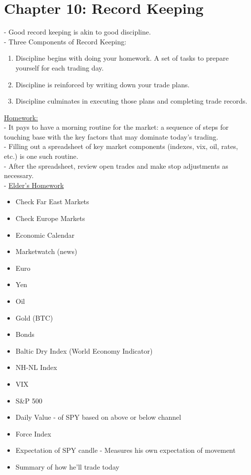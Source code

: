 \documentclass[12pt,fullpage]{article}
\begin{document}
\section*{Chapter 10: Record Keeping}
- Good record keeping is akin to good discipline.\\
- Three Components of Record Keeping:
\begin{enumerate}
   \itemsep0em
   \item Discipline begins with doing your homework. A set of tasks to prepare yourself for each trading day.
   \item Discipline is reinforced by writing down your trade plans.
   \item Discipline culminates in executing those plans and completing trade records.
\end{enumerate}
\underline{Homework:}\\
- It pays to have a morning routine for the market: a sequence of steps for touching base with the key factors that may dominate today's trading.\\
- Filling out a spreadsheet of key market components (indexes, vix, oil, rates, etc.) is one such routine.\\
- After the spreadsheet, review open trades and make stop adjustments as necessary.\\
- \underline{Elder's Homework}
\begin{itemize}
   \itemsep-0.5em
   \item Check Far East Markets
   \item Check Europe Markets
   \item Economic Calendar
   \item Marketwatch (news)
   \item Euro
   \item Yen
   \item Oil
   \item Gold (BTC)
   \item Bonds
   \item Baltic Dry Index (World Economy Indicator)
   \item NH-NL Index
   \item VIX
   \item S\&P 500
   \item Daily Value - of SPY based on above or below channel
   \item Force Index
   \item Expectation of SPY candle - Measures his own expectation of movement
   \item Summary of how he'll trade today
\end{itemize}
\end{document}
